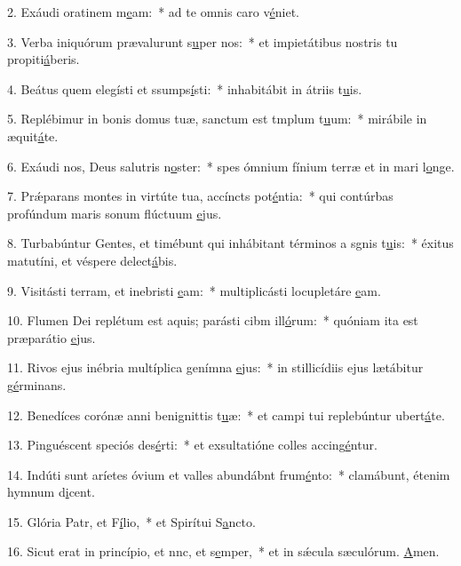 2. Exáudi oratinem m\uline{e}am:~* ad te omnis caro v\uline{é}niet.\par 
3. Verba iniquórum prævalurunt s\uline{u}per nos:~* et impietátibus nostris tu propiti\uline{á}beris.\par 
4. Beátus quem elegísti et ssumps\uline{í}sti:~* inhabitábit in átriis t\uline{u}is.\par 
5. Replébimur in bonis domus tuæ, sanctum est tmplum t\uline{u}um:~* mirábile in æquit\uline{á}te.\par 
6. Exáudi nos, Deus salutris n\uline{o}ster:~* spes ómnium fínium terræ et in mari l\uline{o}nge.\par 
7. Prǽparans montes in virtúte tua, accíncts pot\uline{é}ntia:~* qui contúrbas profúndum maris sonum flúctuum \uline{e}jus.\par 
8. Turbabúntur Gentes, et timébunt qui inhábitant términos a sgnis t\uline{u}is:~* éxitus matutíni, et véspere delect\uline{á}bis.\par 
9. Visitásti terram, et inebristi \uline{e}am:~* multiplicásti locupletáre \uline{e}am.\par 
10. Flumen Dei replétum est aquis; parásti cibm ill\uline{ó}rum:~* quóniam ita est præparátio \uline{e}jus.\par 
11. Rivos ejus inébria multíplica genímna \uline{e}jus:~* in stillicídiis ejus lætábitur g\uline{é}rminans.\par 
12. Benedíces corónæ anni benignittis t\uline{u}æ:~* et campi tui replebúntur ubert\uline{á}te.\par 
13. Pinguéscent speciós des\uline{é}rti:~* et exsultatióne colles accing\uline{é}ntur.\par 
14. Indúti sunt aríetes óvium et valles abundábnt frum\uline{é}nto:~* clamábunt, étenim hymnum d\uline{i}cent.\par 
15. Glória Patr, et F\uline{í}lio,~* et Spirítui S\uline{a}ncto.\par 
16. Sicut erat in princípio, et nnc, et s\uline{e}mper,~* et in sǽcula sæculórum. \uline{A}men.\par 
